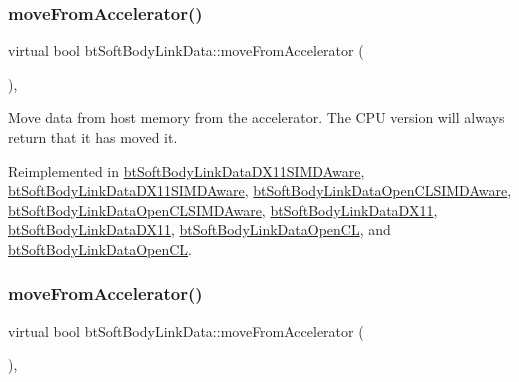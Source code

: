 \subsubsection{\texorpdfstring{move\+From\+Accelerator()}{moveFromAccelerator()}\hspace{0.1cm}{\footnotesize\ttfamily [1/2]}}
{\footnotesize\ttfamily virtual bool bt\+Soft\+Body\+Link\+Data\+::move\+From\+Accelerator (\begin{DoxyParamCaption}{ }\end{DoxyParamCaption})\hspace{0.3cm}{\ttfamily [inline]}, {\ttfamily [virtual]}}

Move data from host memory from the accelerator. The C\+PU version will always return that it has moved it. 

Reimplemented in \hyperlink{classbtSoftBodyLinkDataDX11SIMDAware_a86ffcd3e1eae29d3a9019790d4172990}{bt\+Soft\+Body\+Link\+Data\+D\+X11\+S\+I\+M\+D\+Aware}, \hyperlink{classbtSoftBodyLinkDataDX11SIMDAware_a939884d3e31eb6599b71e466e96f9fc9}{bt\+Soft\+Body\+Link\+Data\+D\+X11\+S\+I\+M\+D\+Aware}, \hyperlink{classbtSoftBodyLinkDataOpenCLSIMDAware_a9eed0794cbaa4b7f0c8dd1fc5570c15f}{bt\+Soft\+Body\+Link\+Data\+Open\+C\+L\+S\+I\+M\+D\+Aware}, \hyperlink{classbtSoftBodyLinkDataOpenCLSIMDAware_a5ae3174b36d5ee2c13c96ddf775785b8}{bt\+Soft\+Body\+Link\+Data\+Open\+C\+L\+S\+I\+M\+D\+Aware}, \hyperlink{classbtSoftBodyLinkDataDX11_aad757252b4538a6f8f6eca526335e71d}{bt\+Soft\+Body\+Link\+Data\+D\+X11}, \hyperlink{classbtSoftBodyLinkDataDX11_a503f2df316127641cde3ab997b511735}{bt\+Soft\+Body\+Link\+Data\+D\+X11}, \hyperlink{classbtSoftBodyLinkDataOpenCL_a47cc8710e80d8e3d00775960c358058d}{bt\+Soft\+Body\+Link\+Data\+Open\+CL}, and \hyperlink{classbtSoftBodyLinkDataOpenCL_a67152548f633d131fbdb33d323f701db}{bt\+Soft\+Body\+Link\+Data\+Open\+CL}.

\mbox{\label{classbtSoftBodyLinkData_a5018ad236aae590df94bca63c1ad7ee1}} 
\subsubsection{\texorpdfstring{move\+From\+Accelerator()}{moveFromAccelerator()}\hspace{0.1cm}{\footnotesize\ttfamily [2/2]}}
{\footnotesize\ttfamily virtual bool bt\+Soft\+Body\+Link\+Data\+::move\+From\+Accelerator (\begin{DoxyParamCaption}{ }\end{DoxyParamCaption})\hspace{0.3cm}{\ttfamily [inline]}, {\ttfamily [virtual]}}

